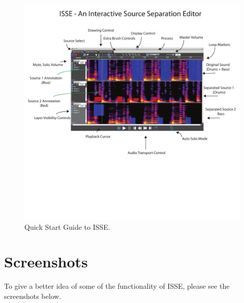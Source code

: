 \documentclass[11pt]{article}
\begin{document}
\begin{figure}[h!]
\centering
\includegraphics[trim = 2cm 0mm 0mm 0mm, width=1.1\textwidth]{images/ISSE-Quick-Start.pdf}
\caption{Quick Start Guide to ISSE.}
\label{fig:ise}
\end{figure}



\newpage
\section{Screenshots}
To give a better idea of some of the functionality of ISSE, please see the screenshots below.
\end{document}
